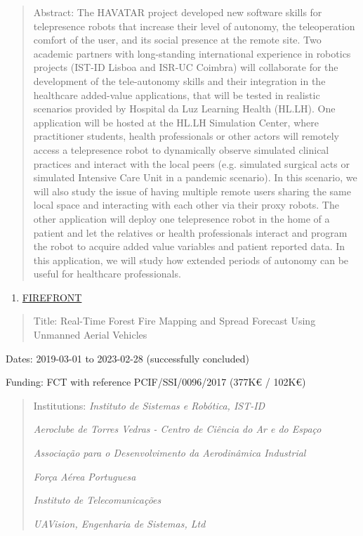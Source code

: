\begin{quote}
Abstract: The HAVATAR project developed new software skills for
telepresence robots that increase their level of autonomy, the
teleoperation comfort of the user, and its social presence at the remote
site. Two academic partners with long-standing international experience
in robotics projects (IST-ID Lisboa and ISR-UC Coimbra) will collaborate
for the development of the tele-autonomy skills and their integration in
the healthcare added-value applications, that will be tested in
realistic scenarios provided by Hospital da Luz Learning Health (HL.LH).
One application will be hosted at the HL.LH Simulation Center, where
practitioner students, health professionals or other actors will
remotely access a telepresence robot to dynamically observe simulated
clinical practices and interact with the local peers (e.g. simulated
surgical acts or simulated Intensive Care Unit in a pandemic scenario).
In this scenario, we will also study the issue of having multiple remote
users sharing the same local space and interacting with each other via
their proxy robots. The other application will deploy one telepresence
robot in the home of a patient and let the relatives or health
professionals interact and program the robot to acquire added value
variables and patient reported data. In this application, we will study
how extended periods of autonomy can be useful for healthcare
professionals.
\end{quote}

\begin{enumerate}
\def\labelenumi{\arabic{enumi}.}
\setcounter{enumi}{1}
\item
  \ul{FIREFRONT}
\end{enumerate}

\begin{quote}
Title: Real­-Time Forest Fire Mapping and Spread Forecast Using Unmanned
Aerial Vehicles
\end{quote}

Dates: 2019-03-01 to 2023-02-28 (successfully concluded)

Funding: FCT with reference PCIF/SSI/0096/2017 (377K€ / 102K€)

\begin{quote}
Institutions: \emph{Instituto de Sistemas e Robótica, IST-ID}

\emph{Aeroclube de Torres Vedras - Centro de Ciência do Ar e do Espaço}

\emph{Associação para o Desenvolvimento da Aerodinâmica Industrial}

\emph{Força Aérea Portuguesa}

\emph{Instituto de Telecomunicações}

\emph{UAVision, Engenharia de Sistemas, Ltd}
\end{quote}


